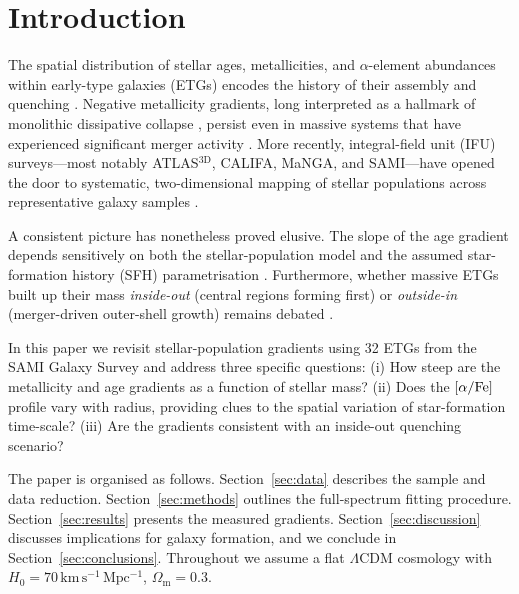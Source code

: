 \section{Introduction}
\label{sec:intro}

The spatial distribution of stellar ages, metallicities, and
$\alpha$-element abundances within early-type galaxies (ETGs) encodes
the history of their assembly and quenching
\citep{Thomas2005,Kuntschner2010}.
Negative metallicity gradients, long interpreted as a hallmark of
monolithic dissipative collapse \citep{Larson1974}, persist even in
massive systems that have experienced significant merger activity
\citep{Greene2015}.
More recently, integral-field unit (IFU) surveys---most notably
ATLAS$^{\mathrm{3D}}$, CALIFA, MaNGA, and SAMI---have opened the
door to systematic, two-dimensional mapping of stellar populations
across representative galaxy samples \citep{McDermid2015,GonzalezDelgado2015}.

A consistent picture has nonetheless proved elusive.
The slope of the age gradient depends sensitively on both the
stellar-population model and the assumed star-formation history (SFH)
parametrisation \citep{Goddard2017}.
Furthermore, whether massive ETGs built up their mass
\emph{inside-out} (central regions forming first) or
\emph{outside-in} (merger-driven outer-shell growth) remains
debated \citep{Peletier1990,Trujillo2011}.

In this paper we revisit stellar-population gradients using
32 ETGs from the SAMI Galaxy Survey and address three specific
questions:
(i) How steep are the metallicity and age gradients as a function of
    stellar mass?
(ii) Does the $[\alpha/\mathrm{Fe}]$ profile vary with radius, providing clues to
     the spatial variation of star-formation time-scale?
(iii) Are the gradients consistent with an inside-out quenching
     scenario?

The paper is organised as follows.
Section~\ref{sec:data} describes the sample and data reduction.
Section~\ref{sec:methods} outlines the full-spectrum fitting
procedure.
Section~\ref{sec:results} presents the measured gradients.
Section~\ref{sec:discussion} discusses implications for galaxy
formation, and we conclude in Section~\ref{sec:conclusions}.
Throughout we assume a flat $\Lambda$CDM cosmology with
$H_0 = 70\,\mathrm{km\,s^{-1}\,Mpc^{-1}}$, $\Omega_\mathrm{m}=0.3$.

